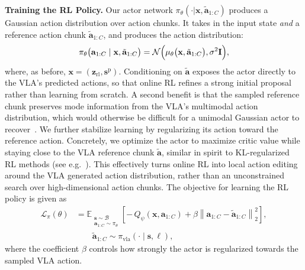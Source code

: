 \textbf{Training the RL Policy.}
Our actor network $\pi_\theta(\cdot| \mathbf{x},\tilde{\mathbf{a}}_{1:C})$ produces a Gaussian action distribution over action chunks. It takes in the input state  \emph{and} a reference action chunk $\tilde{\mathbf{a}}_{1:C}$, and produces the action distribution: 
\begin{equation}
\pi_\theta\bigl(\mathbf{a}_{1:C} \mid \mathbf{x}, \tilde{\mathbf{a}}_{1:C}\bigr)
  =
  \mathcal{N}\Bigl(
    \mu_\theta\bigl(\mathbf{x}, \tilde{\mathbf{a}}_{1:C} \bigr),
    \sigma^2 \mathbf{I}
  \Bigr),
  \label{eq:policy}
\end{equation}
where, as before, $\mathbf{x} =(\mathbf{z}_\text{rl}, \mathbf{s}^\text{p})$.
Conditioning on $\tilde{\mathbf{a}}$ exposes the actor directly to the VLA’s predicted actions, so that online RL refines a strong initial proposal rather than learning from scratch. 
A second benefit is that the sampled reference chunk preserves mode information from the VLA’s multimodal action distribution, which would otherwise be difficult for a unimodal Gaussian actor to recover~\cite{fql_park2025}.
We further stabilize learning by regularizing its action toward the reference action. Concretely, we optimize the actor to maximize critic value while staying close to the VLA reference chunk $\tilde{\mathbf{a}}$, similar in spirit to KL-regularized RL methods (see e.g.~\citep{peng2020learning,PetersREPS,Abdolmaleki2018MaximumAP,Dayan1997UsingEM,levine2018reinforcementlearningcontrolprobabilistic}). This effectively turns online RL into local action editing around the VLA generated action distribution, rather than an unconstrained search over high-dimensional action chunks. The objective for learning the RL policy is given as
\begin{equation}
\begin{aligned}
\mathcal{L}_{\pi}(\theta)
&=
\mathbb{E}_{\substack{\mathbf{s} \sim \mathcal{B} \\
\mathbf{a}_{1:C} \sim \pi_\theta}}
\left[
-\,Q_\psi(\mathbf{x}, \mathbf{a}_{1:C})
+\beta \left\|\mathbf{a}_{1:C}-\tilde{\mathbf{a}}_{1:C}\right\|_2^2
\right], \\
\qquad
& \qquad \tilde{\mathbf{a}}_{1:C}\sim\pi_{\mathrm{vla}}(\cdot\mid\mathbf{s}, \ell),
\end{aligned}
\label{eq:actor_loss}
\end{equation}
where the coefficient $\beta$ controls how strongly the actor is regularized towards the sampled VLA action. 

